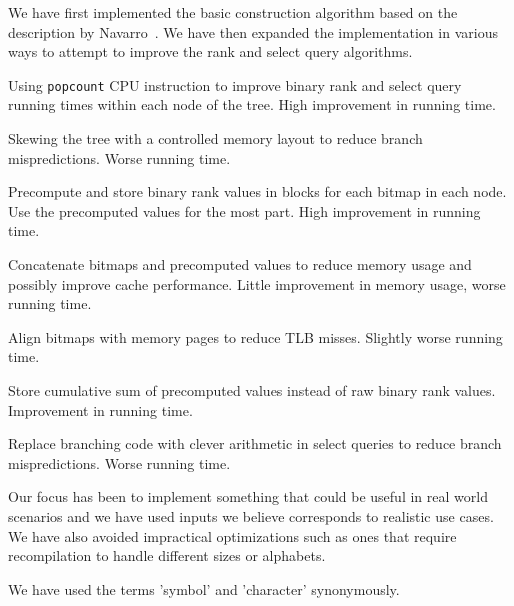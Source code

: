We have first implemented the basic construction algorithm based on the description by Navarro~.
We have then expanded the implementation in various ways to attempt to improve the rank and select query algorithms.
\begin{description*}
\item[Using \texttt{popcount} CPU instruction] to improve binary rank and select query running times within each node of the tree. High improvement in running time.
\item[Skewing the tree] with a controlled memory layout to reduce branch mispredictions. Worse running time.
\item[Precompute and store binary rank values] in blocks for each bitmap in each node. Use the precomputed values for the most part. High improvement in running time.
\item[Concatenate bitmaps and precomputed values] to reduce memory usage and possibly improve cache performance. Little improvement in memory usage, worse running time.
\item[Align bitmaps with memory pages] to reduce TLB misses. Slightly worse running time.
\item[Store cumulative sum of precomputed values] instead of raw binary rank values. Improvement in running time.
\item[Replace branching code with clever arithmetic] in select queries to reduce branch mispredictions. Worse running time.
\end{description*}
Our focus has been to implement something that could be useful in real world scenarios and we have used inputs we believe corresponds to realistic use cases.
We have also avoided impractical optimizations such as ones that require recompilation to handle different sizes or alphabets.

We have used the terms 'symbol' and 'character' synonymously.
